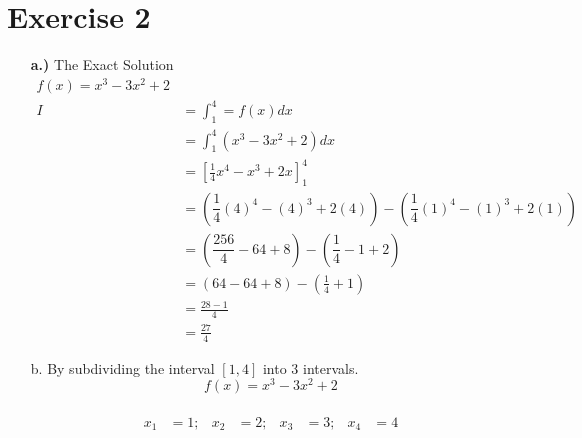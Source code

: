 \section*{\textbf{Exercise 2}}
\begin{itemize}
\item[\textbf{a.)}] The Exact Solution
\begin{align*}
f\left( x\right) = x^{3} - 3x^{2} + 2\\
I &=  \int_{1}^{4} = f\left( x\right) dx\\
&= \int_{1}^{4}\left(   x^{3} - 3x^{2} + 2\right)  dx\\
&= \left[ \frac{1}{4} x^{4} - x^{3} + 2x \right]_{1}^{4} \\
&= \left( \dfrac{1}{4}\left( 4\right)^{4} - \left( 4\right)^{3} +  2\left( 4\right) \right) - \left( \dfrac{1}{4}\left( 1\right)^{4} - \left( 1\right)^{3} +  2\left( 1\right) \right)\\  
&= \left( \dfrac{256}{4}-64 +8 \right) -  \left( \dfrac{1}{4}- 1 + 2 \right)\\
&= \left( 64 - 64 + 8 \right) - \left( \frac{1}{4} + 1\right) \\ 
&= \frac{28-1}{4}\\
&= \frac{27}{4}
\end{align*}
\item[b.] By subdividing the interval $[1,4]$
 into $3$ intervals.\\
$$f\left( x\right) = x^{3} - 3x^{2} + 2$$
\\
\begin{align*}
x_1&=1; & x_2&=2; & x_3&=3; & x_4&=4\\
\end{align*}


\end{itemize}
